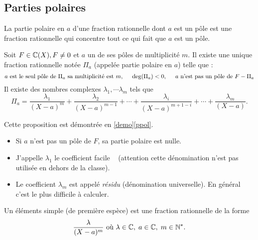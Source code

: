 \subsection{Parties polaires}
La partie polaire en $a$ d'une fraction rationnelle dont $a$ est un pôle est une fraction rationnelle qui concentre tout ce qui fait que $a$ est un pôle.
\begin{prop}
 Soit $F \in \mathbb{C}(X), F \neq 0$ et $a$ un de ses pôles de multiplicité $m$. Il existe une unique fraction rationnelle notée $\Pi_a$ (appelée partie polaire en $a$) telle que :
\begin{displaymath}
 a \text{ est le seul pôle de } \Pi_a \text{ sa multiplicité est } m,\hspace{0,5cm}
 \deg(\Pi_a) <0 ,\hspace{0,5cm}
 a \text{ n'est pas un pôle de } F-\Pi_a 
\end{displaymath}
Il existe des nombres complexes $\lambda_1,\cdots\lambda_m$ tels que
\begin{displaymath}
 \Pi_a = 
\frac{\lambda_1}{(X-a)^m}+\frac{\lambda_2}{(X-a)^{m-1}}+\cdots +\frac{\lambda_i}{(X-a)^{m+1-i}}+\cdots+ \frac{\lambda_m}{(X-a)}.
\end{displaymath}
\end{prop}
\begin{demo}
 Cette proposition est démontrée en \ref{demo}\ref{ppol}.
\end{demo}
\begin{rems}
\begin{itemize}
 \item Si $a$ n'est pas un pôle de $F$, sa partie polaire est nulle.
 \item {}  J'appelle $\lambda_1$ le coefficient \og facile \fg~ (attention cette dénomination n'est pas utilisée en dehors de la classe).
 \item Le coefficient $\lambda_m$ est appelé \emph{résidu} (dénomination universelle). En général c'est le plus difficile à calculer.
\end{itemize}
\end{rems}

\begin{defi}
 Un éléments simple (de première espèce) est une fraction rationnelle de la forme
\begin{displaymath}
 \frac{\lambda}{(X-a)^m}\text{ où } \lambda\in \mathbb{C},\; a\in\mathbb{C},\; m\in \mathbb{N}^*.
\end{displaymath}
\end{defi}

